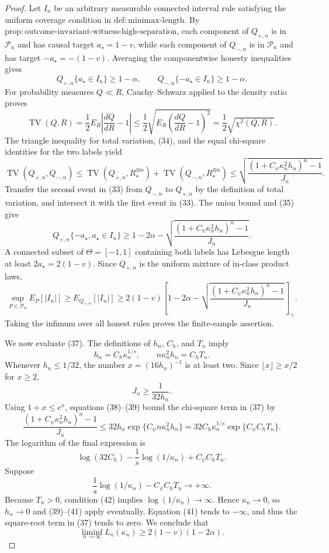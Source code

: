 \documentclass{article}
\begin{document}
\begin{proof}
Let \(I_n\) be an arbitrary measurable connected interval rule satisfying the uniform coverage condition in \(\mathrm{def:minimax\mbox{-}length}\).  By \(\mathrm{prop:outcome\mbox{-}invariant\mbox{-}witness\mbox{-}high\mbox{-}separation}\), each component of \(Q_{+,n}\) is in \(\mathcal P_n\) and has causal target \(a_\star=1-v\), while each component of \(Q_{-,n}\) is in \(\mathcal P_n\) and has target \(-a_\star=-(1-v)\).  Averaging the componentwise honesty inequalities gives
\[
Q_{+,n}\{a_\star\in I_n\}\ge1-\alpha,
\qquad
Q_{-,n}\{-a_\star\in I_n\}\ge1-\alpha.
\tag{33}
\]
For probability measures \(Q\ll R\), Cauchy--Schwarz applied to the density ratio proves
\[
\operatorname{TV}(Q,R)
=\frac12E_R\left|\frac{dQ}{dR}-1\right|
\le\frac12\sqrt{E_R\left(\frac{dQ}{dR}-1\right)^2}
=\frac12\sqrt{\chi^2(Q,R)}.
\tag{34}
\]
The triangle inequality for total variation, (34), and the equal chi-square identities for the two labels yield
\[
\operatorname{TV}(Q_{+,n},Q_{-,n})
\le\operatorname{TV}(Q_{+,n},R_\star^{\otimes n})
   +\operatorname{TV}(Q_{-,n},R_\star^{\otimes n})
\le
\sqrt{\frac{\left(1+C_\psi\kappa_n^2h_n\right)^n-1}{J_n}}.
\tag{35}
\]
Transfer the second event in (33) from \(Q_{-,n}\) to \(Q_{+,n}\) by the definition of total variation, and intersect it with the first event in (33).  The union bound and (35) give
\[
Q_{+,n}\{-a_\star,a_\star\in I_n\}
\ge1-2\alpha-
\sqrt{\frac{\left(1+C_\psi\kappa_n^2h_n\right)^n-1}{J_n}}.
\tag{36}
\]
A connected subset of \(\Theta=[-1,1]\) containing both labels has Lebesgue length at least \(2a_\star=2(1-v)\).  Since \(Q_{+,n}\) is the uniform mixture of in-class product laws,
\[
\sup_{P\in\mathcal P_n}E_P[|I_n|]
\ge E_{Q_{+,n}}[|I_n|]
\ge2(1-v)\left[
1-2\alpha-
\sqrt{\frac{\left(1+C_\psi\kappa_n^2h_n\right)^n-1}{J_n}}
\right]_+.
\tag{37}
\]
Taking the infimum over all honest rules proves the finite-sample assertion.

We now evaluate (37).  The definitions of \(h_n\), \(C_h\), and \(T_n\) imply
\[
h_n=C_h\kappa_n^{1/s},
\qquad
n\kappa_n^2h_n=C_hT_n.
\tag{38}
\]
Whenever \(h_n\le1/32\), the number \(x=(16h_n)^{-1}\) is at least two.  Since \(\lfloor x\rfloor\ge x/2\) for \(x\ge2\),
\[
J_n\ge\frac1{32h_n}.
\tag{39}
\]
Using \(1+x\le e^x\), equations (38)--(39) bound the chi-square term in (37) by
\[
\frac{\left(1+C_\psi\kappa_n^2h_n\right)^n-1}{J_n}
\le32h_n\exp\{C_\psi n\kappa_n^2h_n\}
=32C_h\kappa_n^{1/s}\exp\{C_\psi C_hT_n\}.
\tag{40}
\]
The logarithm of the final expression is
\[
\log(32C_h)-\frac1s\log(1/\kappa_n)+C_\psi C_hT_n.
\tag{41}
\]
Suppose
\[
\frac1s\log(1/\kappa_n)-C_\psi C_hT_n\longrightarrow+\infty.
\tag{42}
\]
Because \(T_n>0\), condition (42) implies \(\log(1/\kappa_n)\to\infty\).  Hence \(\kappa_n\to0\), so \(h_n\to0\) and (39)--(41) apply eventually.  Equation (41) tends to \(-\infty\), and thus the square-root term in (37) tends to zero.  We conclude that
\[
\liminf_{n\to\infty}L_n(\kappa_n)
\ge2(1-v)(1-2\alpha).
\tag{43}
\]


\end{proof}
\end{document}
